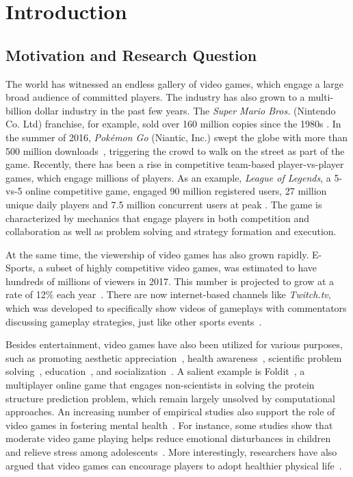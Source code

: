 
\chapter{Introduction} %

\label{chapter:intro} 

\section{Motivation and Research Question}\label{chap1:motiv}

The world has witnessed an endless gallery of video games, which engage a large broad audience of committed players. The industry has also grown to a multi-billion dollar industry in the past few years. The \textit{Super Mario Bros.}  (Nintendo Co. Ltd) franchise, for example, sold over 160 million copies since the 1980s \citep{mariosale}. In the summer of 2016, \textit{Pok\'{e}mon Go} (Niantic, Inc.) swept the globe with more than 500 million downloads~\citep{pokemongo}, triggering the crowd to walk on the street as part of the game. Recently, there has been a rise in competitive team-based player-vs-player games, which engage millions of players. As an example, \textit{League of Legends}, a 5-vs-5 online competitive game, engaged 90 million registered users, 27 million unique daily players and 7.5 million concurrent users at peak \citep{lol_fanbase,lol_27million}. The game is characterized by mechanics that engage players in both competition and collaboration as well as problem solving and strategy formation and execution. 

At the same time, the viewership of video games has also grown rapidly. E-Sports, a subset of highly competitive video games, was estimated to have hundreds of millions of viewers in 2017. This number is projected to grow at a rate of 12\% each year~\citep{superdata2017}. There are now internet-based channels like \textit{Twitch.tv}, which was developed to specifically show videos of gameplays with commentators discussing gameplay strategies, just like other sports events~\citep{superdata2017stream}.  

Besides entertainment, video games have also been utilized for various purposes, such as promoting aesthetic appreciation~\citep{jarvinen2008understanding}, health awareness~\citep{shiyko2016effects}, scientific problem solving~\citep{cooper2010predicting}, education~\citep{gee2003video}, and socialization~\citep{ferguson2013friends}. A salient example is Foldit~\citep{cooper2010predicting}, a multiplayer online game that engages non-scientists in solving the protein structure prediction problem, which remain largely unsolved by computational approaches. An increasing number of empirical studies also support the role of video games in fostering mental health~\citep{jones2014gaming}. For instance, some studies show that moderate video game playing helps reduce emotional disturbances in children~\citep{hull2009computer} and relieve stress among adolescents~\citep{colwell2007needs}. More interestingly, researchers have also argued that video games can encourage players to adopt healthier physical life~\citep{shiyko2016effects}. 

